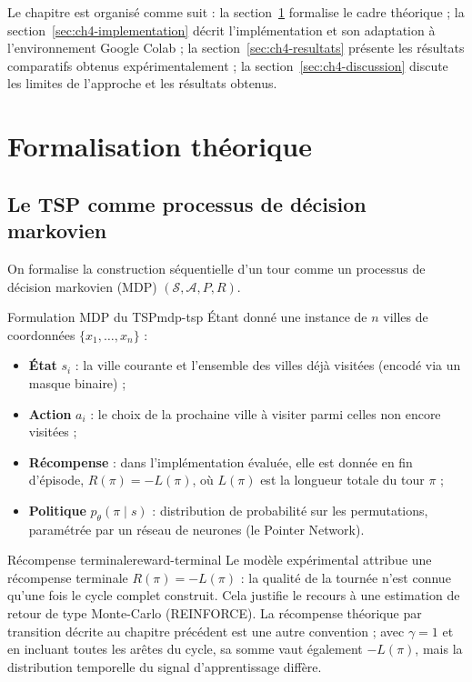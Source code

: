 \documentclass[12pt, a4paper, twoside, openright]{book}
\begin{document}
Le chapitre est organisé comme suit : la section~\ref{sec:ch4-theorie} formalise
le cadre théorique ; la section~\ref{sec:ch4-implementation} décrit
l'implémentation et son adaptation à l'environnement Google Colab ; la
section~\ref{sec:ch4-resultats} présente les résultats comparatifs obtenus
expérimentalement ; la section~\ref{sec:ch4-discussion} discute les limites
de l'approche et les résultats obtenus.

\section{Formalisation théorique}
\label{sec:ch4-theorie}

\subsection{Le TSP comme processus de décision markovien}
\label{sec:ch4-mdp}

On formalise la construction séquentielle d'un tour comme un processus de
décision markovien (MDP) $(\mathcal{S}, \mathcal{A}, P, R)$.

\begin{definition}{Formulation MDP du TSP}{mdp-tsp}
	Étant donné une instance de $n$ villes de coordonnées $\{x_1, \dots, x_n\}$ :
	\begin{itemize}
		\item \textbf{État} $s_i$ : la ville courante et l'ensemble des villes
		déjà visitées (encodé via un masque binaire) ;
		\item \textbf{Action} $a_i$ : le choix de la prochaine ville à visiter
		parmi celles non encore visitées ;
		\item \textbf{Récompense} : dans l'implémentation évaluée, elle est donnée en fin d'épisode,
		$R(\pi)=-L(\pi)$, où $L(\pi)$ est la longueur totale du tour $\pi$ ;
		\item \textbf{Politique} $p_\theta(\pi \mid s)$ : distribution de
		probabilité sur les permutations, paramétrée par un réseau de neurones
		(le Pointer Network).
	\end{itemize}
\end{definition}

\begin{remark}{Récompense terminale}{reward-terminal}
	Le modèle expérimental attribue une récompense terminale $R(\pi)=-L(\pi)$ : la qualité de la tournée n'est connue qu'une fois le cycle complet construit. Cela justifie le recours à une estimation de retour de type Monte-Carlo (REINFORCE). La récompense théorique par transition décrite au chapitre précédent est une autre convention ; avec $\gamma=1$ et en incluant toutes les arêtes du cycle, sa somme vaut également $-L(\pi)$, mais la distribution temporelle du signal d'apprentissage diffère.
\end{remark}
\end{document}
